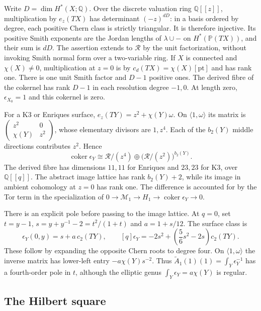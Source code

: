 Write $D=\dim H^*(X;\mathbb Q)$. Over the discrete
valuation ring $\mathbb Q[[z]]$, multiplication by
$e_z(TX)$ has determinant $(-z)^{dD}$: in a basis ordered
by degree, each positive Chern class is strictly triangular.
It is therefore injective. Its positive Smith exponents
are the Jordan lengths of $\lambda\cup-$ on
$H^*(\mathbb P(TX))$, and their sum is $dD$.
The assertion extends to $\mathcal R$ by the unit
factorization, without invoking Smith normal form over a
two-variable ring. If $X$ is connected and $\chi(X)\ne0$,
multiplication at $z=0$ is by $c_d(TX)=\chi(X)[\mathrm{pt}]$
and has rank one. There is one unit Smith factor and
$D-1$ positive ones. The derived fibre of the cokernel
has rank $D-1$ in each resolution degree $-1,0$.
At length zero, $\epsilon_{X_0}=1$ and this cokernel is zero.

For a K3 or Enriques surface, $e_z(TY)=z^2+\chi(Y)\omega$.
On $\langle1,\omega\rangle$ its matrix is
$\left(\begin{smallmatrix}z^2&0\\\chi(Y)&z^2\end{smallmatrix}\right)$,
whose elementary divisors are $1,z^4$. Each of the
$b_2(Y)$ middle directions contributes $z^2$. Hence
\begin{equation}\label{cyprim:eq:surface-Smith}
 \operatorname{coker}\epsilon_Y
 \cong\mathcal R/(z^4)
       \oplus\bigl(\mathcal R/(z^2)\bigr)^{b_2(Y)}.
\end{equation}
The derived fibre has dimensions $11,11$ for Enriques
and $23,23$ for K3, over $\mathbb Q[[q]]$.
The abstract image lattice has rank $b_2(Y)+2$, while
its image in ambient cohomology at $z=0$ has rank one.
The difference is accounted for by the Tor term in the
specialization of $0\to\mathcal M_1\to H_1\to
\operatorname{coker}\epsilon_Y\to0$.

There is an explicit pole before passing to the image
lattice. At $q=0$, set $t=y-1$,
$s=y+y^{-1}-2=t^2/(1+t)$ and $a=1+s/12$.
The surface class is
\[
 \epsilon_Y(0,y)=s+a\,c_2(TY),\qquad
 [q]\epsilon_Y=-2s^2+
              \left(\frac56s^2-2s\right)c_2(TY).
\]
These follow by expanding the opposite Chern roots to
degree four. On $\langle1,\omega\rangle$ the inverse
matrix has lower-left entry $-a\chi(Y)s^{-2}$.
Thus $\widetilde A_1(1)(1)=\int_Y\epsilon_Y^{-1}$
has a fourth-order pole in $t$, although the elliptic
genus $\int_Y\epsilon_Y=a\chi(Y)$ is regular.

\subsection{The Hilbert square}

